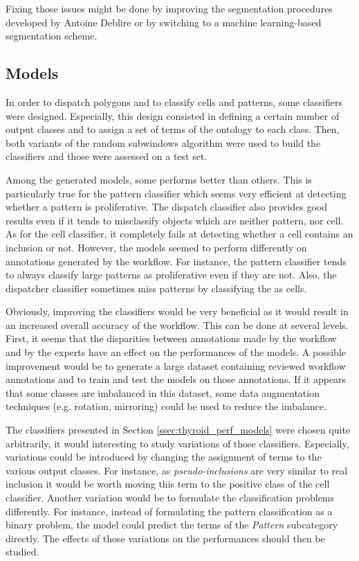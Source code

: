 Fixing those issues might be done by improving the segmentation procedures developed by Antoine Deblire or by switching to a machine learning-based segmentation scheme.

\subsection{Models}
In order to dispatch polygons and to classify cells and patterns, some classifiers were designed. Especially, this design consisted in defining a certain number of output classes and to assign a set of terms of the ontology to each class. Then, both variants of the random subwindows algorithm were used to build the classifiers and those were assessed on a test set. 

Among the generated models, some performs better than others. This is particularly true for the pattern classifier which seems very efficient at detecting whether a pattern is proliferative. The dispatch classifier also provides good results even if it tends to misclassify objects which are neither pattern, nor cell. As for the cell classifier, it completely fails at detecting whether a cell contains an inclusion or not. However, the models seemed to perform differently on annotations generated by the workflow. For instance, the pattern classifier tends to always classify large patterns as proliferative even if they are not. Also, the dispatcher classifier sometimes miss patterns by classifying the as cells. 

Obviously, improving the classifiers would be very beneficial as it would result in an increased overall accuracy of the workflow. This can be done at several levels. First, it seems that the disparities between annotations made by the workflow and by the experts have an effect on the performances of the models. A possible improvement would be to generate a large dataset containing reviewed workflow annotations and to train and test the models on those annotations.  If it appears that some classes are imbalanced in this dataset, some data augmentation techniques (e.g. rotation, mirroring) could be used to reduce the imbalance.  

The classifiers presented in Section \ref{ssec:thyroid_perf_models} were chosen quite arbitrarily, it would interesting to study variations of those classifiers. Especially, variations could be introduced by changing the assignment of terms to the various output classes. For instance, as \textit{pseudo-inclusions} are very similar to real inclusion it would be worth moving this term to the positive class of the cell classifier. Another variation would be to formulate the classification problems differently. For instance, instead of formulating the pattern classification as a binary problem, the model could predict the terms of the \textit{Pattern} subcategory directly. The effects of those variations on the performances should then be studied.
 
